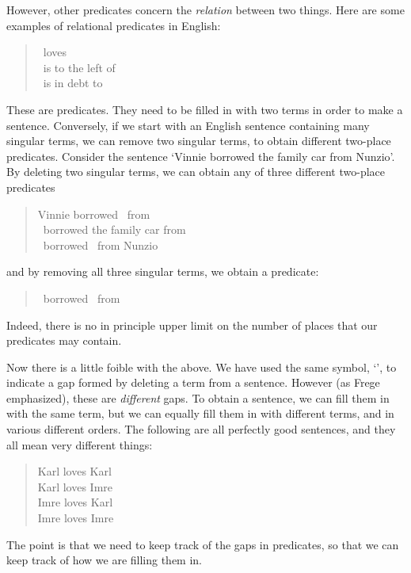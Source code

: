 However, other predicates concern the \emph{relation} between two things. Here are some examples of relational predicates in English:
	\begin{quote}
		\blank\ loves \blank\\
		\blank\ is to the left of \blank\\
		\blank\ is in debt to \blank
	\end{quote}
These are  predicates. They need to be filled in with two terms in order to make a sentence. Conversely, if we start with an English sentence containing many singular terms, we can remove two singular terms, to obtain different two-place predicates. Consider the sentence `Vinnie borrowed the family car from Nunzio'. By deleting two singular terms, we can obtain any of three different two-place predicates
	\begin{quote}
		Vinnie borrowed \blank\ from \blank\\
		\blank\ borrowed the family car from \blank\\
		\blank\ borrowed \blank\ from Nunzio
	\end{quote}
and by removing all three singular terms, we  obtain a  predicate:
	\begin{quote}
		\blank\ borrowed \blank\ from \blank
	\end{quote}
Indeed, there is no in principle upper limit on the number of places that our predicates may contain.

Now there is a little foible with the above. We have used the same symbol, `\blank', to indicate a gap formed by deleting a term from a sentence. However (as Frege emphasized), these are \emph{different} gaps. To obtain a sentence, we can fill them in with the same term, but we can equally fill them in with different terms, and in various different orders. The following are all perfectly good sentences, and they all mean very different things:
	\begin{quote}
		Karl loves Karl\\
		Karl loves Imre\\
		Imre loves Karl\\
		Imre loves Imre
	\end{quote}
The point is that we need to keep track of the gaps in predicates, so that we can keep track of how we are filling them in. 


